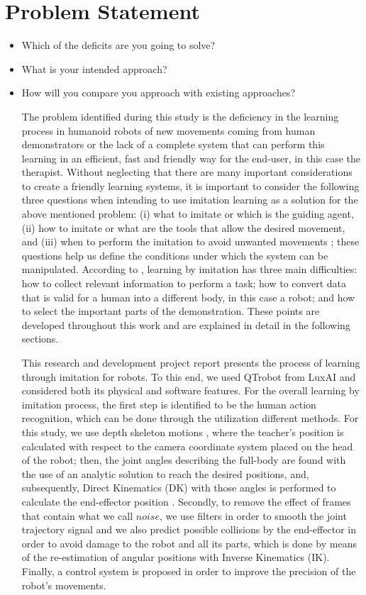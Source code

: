 \documentclass[thesis]{mas_proposal}
\begin{document}
\section{Problem Statement}
\begin{itemize}
    \item Which of the deficits are you going to solve?
    \item What is your intended approach?
    \item How will you compare you approach with existing approaches?
    
     The problem identified during this study is the deficiency in the learning process in humanoid robots of new movements coming from human demonstrators or the lack of a complete system that can perform this learning in an efficient, fast and friendly way for the end-user, in this case the therapist. Without neglecting that there are many important considerations to create a friendly learning systems, it is important to consider the following three questions when intending to use imitation learning as a solution for the above mentioned problem: (i) what to imitate or which is the guiding agent, (ii) how to imitate or what are the tools that allow the desired movement, and (iii) when to perform the imitation to avoid unwanted movements \cite{Billard_2004}; these questions help us define the conditions under which the system can be manipulated. According to \cite{lopes2005developmental}, learning by imitation has three main difficulties: how to collect relevant information to perform a task; how to convert data that is valid for a human into a different body, in this case a robot; and how to select the important parts of the demonstration. These points are developed throughout this work and are explained in detail in the following sections.
    
    This research and development project report presents the process of learning through imitation for robots. To this end, we used QTrobot from LuxAI \cite{qtrobot_safety_manual} and considered both its physical and software features. For the overall learning by imitation process, the first step is identified to be the human action recognition, which can be done through the utilization different methods. For this study, we use depth skeleton motions \cite{Chen_2016}, where the teacher's position is calculated with respect to the camera coordinate system placed on the head of the robot; then, the joint angles describing the full-body are found with the use of an analytic solution to reach the desired positions, and, subsequently, Direct Kinematics (DK) with those angles is performed to calculate the end-effector position \cite{Riley}. Secondly, to remove the effect of frames that contain what we call $noise$, we use filters in order to smooth the joint trajectory signal and we also predict possible collisions by the end-effector in order to avoid damage to the robot and all its parts, which is done by means of the re-estimation of angular positions with Inverse Kinematics (IK). Finally, a control system is proposed in order to improve the precision of the robot's movements.
    

\end{itemize}
\end{document}
